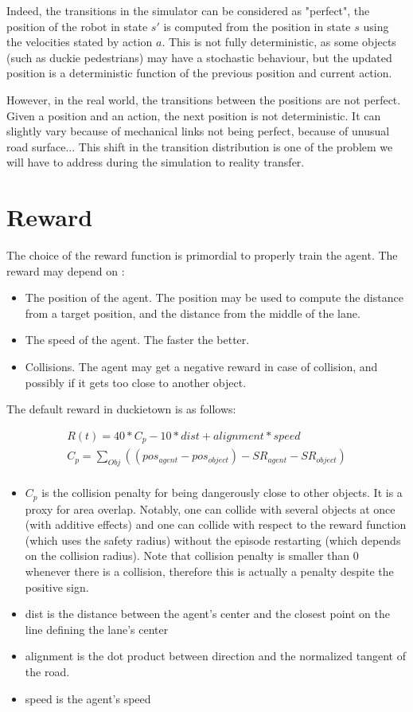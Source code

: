 Indeed, the transitions in the simulator can be considered as "perfect", the position of the robot in state $s'$ is computed from the position in state $s$ using the velocities stated by action $a$.
This is not fully deterministic, as some objects (such as duckie pedestrians) may have a stochastic behaviour, but the updated position is a deterministic function of the previous position and current action.

However, in the real world, the transitions between the positions are not perfect.
Given a position and an action, the next position is not deterministic.
It can slightly vary because of mechanical links not being perfect, because of unusual road surface...
This shift in the transition distribution is one of the problem we will have to address during the simulation to reality transfer.

\section{Reward}
The choice of the reward function is primordial to properly train the agent. The reward may depend on :

\begin{itemize}
    \item The position of the agent. The position may be used to compute the distance from a target position, and the distance from the middle of the lane.
    \item The speed of the agent. The faster the better.
    \item Collisions. The agent may get a negative reward in case of collision, and possibly if it gets too  close to another object.
\end{itemize}

The default reward in duckietown is as follows:

\begin{align}
R(t) = 40 * C_{p} - 10*dist + alignment*speed \\
C_p = \sum_{Obj} ((pos_{agent} - pos_{object}) - SR_{agent} - SR_{object}) \\
\end{align}
\begin{itemize}
    \item $C_p$ is the collision penalty for being dangerously close to other objects. It is a proxy for area overlap. Notably, one can collide with several objects at once (with additive effects) and one can collide with respect to the reward function (which uses the safety radius) without the episode restarting (which depends on the collision radius). Note that collision penalty is smaller than 0 whenever there is a collision, therefore this is actually a penalty despite the positive sign.
    \item dist is the distance between the agent's center and the closest point on the line defining the lane's center
    \item alignment is the dot product between direction and the normalized tangent of the road.
    \item speed is the agent's speed
\end{itemize}

